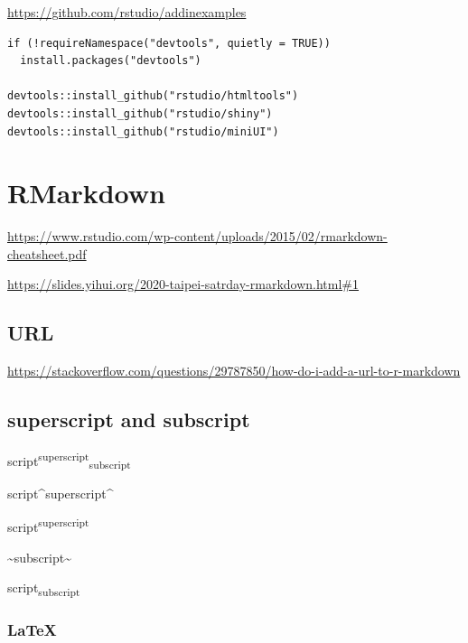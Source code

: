\documentclass[
]{book}
\newenvironment{Shaded}{\begin{snugshade}}{\end{snugshade}}
\newcommand{\NormalTok}[1]{#1}
\theoremstyle{definition}
\theoremstyle{definition}
\theoremstyle{definition}
\theoremstyle{definition}
\theoremstyle{remark}
\begin{document}
\url{https://github.com/rstudio/addinexamples}

\begin{verbatim}
if (!requireNamespace("devtools", quietly = TRUE))
  install.packages("devtools")
  
devtools::install_github("rstudio/htmltools")
devtools::install_github("rstudio/shiny")
devtools::install_github("rstudio/miniUI")
\end{verbatim}

\hypertarget{rmarkdown}{%
\section{RMarkdown}\label{rmarkdown}}

\url{https://www.rstudio.com/wp-content/uploads/2015/02/rmarkdown-cheatsheet.pdf}

\url{https://slides.yihui.org/2020-taipei-satrday-rmarkdown.html\#1}

\hypertarget{url}{%
\subsection{URL}\label{url}}

\url{https://stackoverflow.com/questions/29787850/how-do-i-add-a-url-to-r-markdown}

\hypertarget{superscript-and-subscript}{%
\subsection{superscript and subscript}\label{superscript-and-subscript}}

script\textsuperscript{superscript}\textsubscript{subscript}

\begin{Shaded}
\begin{Highlighting}[]
\NormalTok{script\^{}superscript\^{}}
\end{Highlighting}
\end{Shaded}

script\textsuperscript{superscript}

\begin{Shaded}
\begin{Highlighting}[]
\NormalTok{\textasciitilde{}subscript\textasciitilde{}}
\end{Highlighting}
\end{Shaded}

script\textsubscript{subscript}

\hypertarget{latex}{%
\subsubsection{LaTeX}\label{latex}}
\end{document}
